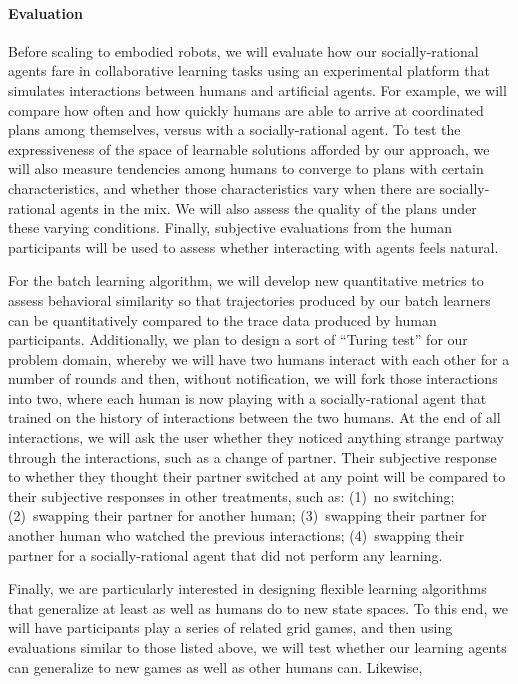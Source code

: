 
\vspace{\up}
\paragraph{Evaluation}

Before scaling to embodied robots,
we will evaluate how our socially-rational agents fare in
collaborative learning tasks using an experimental platform that
simulates interactions between humans and artificial agents.  For
example, we will compare how often and how quickly humans are able to
arrive at coordinated plans among themselves, versus with a
socially-rational agent.  To test the expressiveness of the space of
learnable solutions afforded by our approach, we will also measure
tendencies among humans to converge to plans with certain
characteristics, and whether those characteristics vary when there are
socially-rational agents in the mix.  We will also assess the quality of the
plans under these varying conditions.  Finally, subjective evaluations
from the human participants will be used to assess whether interacting
with agents feels natural.

For the batch learning algorithm, we will develop new quantitative
metrics to assess behavioral similarity so that trajectories produced
by our batch learners can be quantitatively compared to the trace data
produced by human participants.  Additionally, we plan to design a
sort of ``Turing test'' for our problem domain, whereby we will have
two humans interact with each other for a number of rounds and then,
without notification, we will fork those interactions into two, where
each human is now playing with a socially-rational agent that trained
on the history of interactions between the two humans.  At the end of
all interactions, we will ask the user whether they noticed anything
strange partway through the interactions, such as a change of partner.
Their subjective response to whether they thought their partner
switched at any point will be compared to their subjective responses
in other treatments, such as: (1)~no switching; (2)~swapping their
partner for another human; (3)~swapping their partner for another
human who watched the previous interactions; (4)~swapping their
partner for a socially-rational agent that did not perform any
learning.

Finally, we are particularly interested in designing flexible learning
algorithms that generalize at least as well as humans do to new state
spaces.  To this end, we will have participants play a series of
related grid games, and then using evaluations similar to those listed
above, we will test whether our learning agents can generalize to new
games as well as other humans can.  Likewise,

